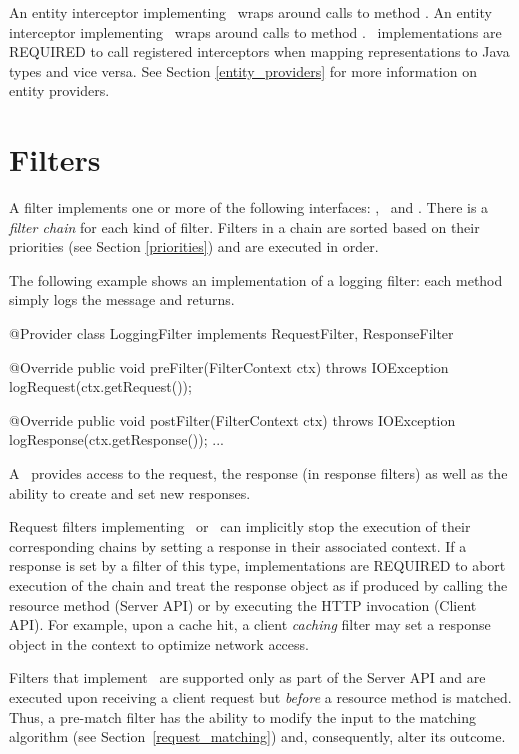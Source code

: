 An entity interceptor implementing \ReaderInterceptor\ wraps around calls to  method . An entity interceptor implementing \WriterInterceptor\ wraps around calls to  method . \jaxrs\ implementations are REQUIRED to call registered interceptors when mapping representations to Java types and vice versa. See Section \ref{entity_providers} for more information on entity providers.

\section{Filters}
\label{filters}

A filter implements one or more of the following interfaces:  \RequestFilter, \PreMatchRequestFilter\ and \ResponseFilter. There is a \emph{filter chain} for each kind of filter. Filters in a chain are sorted based on their priorities (see Section \ref{priorities}) and are executed in order. 


The following example shows an implementation of a logging filter: each method simply logs the message and returns.

\begin{listing}{1}
@Provider
class LoggingFilter implements RequestFilter, ResponseFilter {

    @Override
    public void preFilter(FilterContext ctx) throws IOException {
        logRequest(ctx.getRequest());
    }

    @Override
    public void postFilter(FilterContext ctx) throws IOException {
        logResponse(ctx.getResponse());
    }
    ...
}
\end{listing}

A \FilterContext\ provides access to the request, the response (in response filters) as well as the ability to create and set new responses.

Request filters implementing \RequestFilter\ or \PreMatchRequestFilter\ can implicitly stop the execution of their corresponding chains by setting a response in their associated context. If a response is set by a filter of this type, implementations are REQUIRED to abort execution of the chain and treat the response object as if produced by calling the resource method (Server API) or by executing the HTTP invocation (Client API). For example, upon a cache hit, a client {\em caching} filter may set a response object in the context to optimize network access.

Filters that implement \PreMatchRequestFilter\ are supported only as part of the Server API and are executed upon receiving a client request but {\em before} a resource method is matched. Thus, a pre-match filter has the ability to modify the input to the matching algorithm (see Section~\ref{request_matching}) and, consequently, alter its outcome. 

